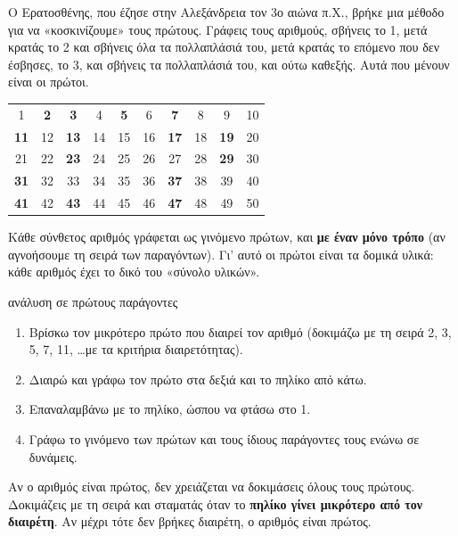 
Ο Ερατοσθένης, που έζησε στην Αλεξάνδρεια τον 3ο αιώνα π.Χ., βρήκε μια μέθοδο για να «κοσκινίζουμε» τους πρώτους. Γράφεις τους αριθμούς, σβήνεις το 1, μετά κρατάς το 2 και σβήνεις όλα τα πολλαπλάσιά του, μετά κρατάς το επόμενο που δεν έσβησες, το 3, και σβήνεις τα πολλαπλάσιά του, και ούτω καθεξής. Αυτά που μένουν είναι οι πρώτοι.

\begin{center}
\renewcommand{\arraystretch}{1.25}
\setlength{\tabcolsep}{5pt}
\newcommand{\pr}[1]{\textcolor{gblue}{\bfseries #1}}
\begin{tabular}{cccccccccc}
1 & \pr{2} & \pr{3} & 4 & \pr{5} & 6 & \pr{7} & 8 & 9 & 10\\
\pr{11} & 12 & \pr{13} & 14 & 15 & 16 & \pr{17} & 18 & \pr{19} & 20\\
21 & 22 & \pr{23} & 24 & 25 & 26 & 27 & 28 & \pr{29} & 30\\
\pr{31} & 32 & 33 & 34 & 35 & 36 & \pr{37} & 38 & 39 & 40\\
\pr{41} & 42 & \pr{43} & 44 & 45 & 46 & \pr{47} & 48 & 49 & 50\\
\end{tabular}
\end{center}


Κάθε σύνθετος αριθμός γράφεται ως γινόμενο πρώτων, και \textbf{με έναν μόνο τρόπο} (αν αγνοήσουμε τη σειρά των παραγόντων). Γι' αυτό οι πρώτοι είναι τα δομικά υλικά: κάθε αριθμός έχει το δικό του «σύνολο υλικών».

\begin{kanonas}{ανάλυση σε πρώτους παράγοντες}
\begin{enumerate}[leftmargin=1.6em,itemsep=0.2ex,topsep=2pt]
\item Βρίσκω τον μικρότερο πρώτο που διαιρεί τον αριθμό (δοκιμάζω με τη σειρά 2, 3, 5, 7, 11, \dots με τα κριτήρια διαιρετότητας).
\item Διαιρώ και γράφω τον πρώτο στα δεξιά και το πηλίκο από κάτω.
\item Επαναλαμβάνω με το πηλίκο, ώσπου να φτάσω στο 1.
\item Γράφω το γινόμενο των πρώτων και τους ίδιους παράγοντες τους ενώνω σε δυνάμεις.
\end{enumerate}
\end{kanonas}

Αν ο αριθμός είναι πρώτος, δεν χρειάζεται να δοκιμάσεις όλους τους πρώτους. Δοκιμάζεις με τη σειρά και σταματάς όταν το \textbf{πηλίκο γίνει μικρότερο από τον διαιρέτη}. Αν μέχρι τότε δεν βρήκες διαιρέτη, ο αριθμός είναι πρώτος.

